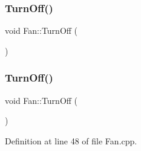\mbox{\label{class_fan_af5a22c8800d5a4f3295f44a313af71d2}} 
\subsubsection{\texorpdfstring{Turn\+Off()}{TurnOff()}\hspace{0.1cm}{\footnotesize\ttfamily [1/2]}}
{\footnotesize\ttfamily void Fan\+::\+Turn\+Off (\begin{DoxyParamCaption}{ }\end{DoxyParamCaption})\hspace{0.3cm}{\ttfamily [protected]}}

\mbox{\label{class_fan_af5a22c8800d5a4f3295f44a313af71d2}} 
\subsubsection{\texorpdfstring{Turn\+Off()}{TurnOff()}\hspace{0.1cm}{\footnotesize\ttfamily [2/2]}}
{\footnotesize\ttfamily void Fan\+::\+Turn\+Off (\begin{DoxyParamCaption}{ }\end{DoxyParamCaption})\hspace{0.3cm}{\ttfamily [protected]}}



Definition at line 48 of file Fan.\+cpp.

